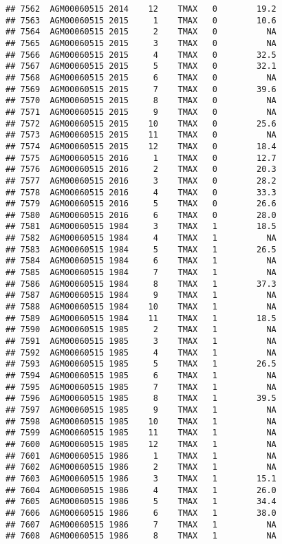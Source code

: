 \documentclass{article}\usepackage[]{graphicx}\usepackage[]{color}
\makeatletter
\newenvironment{kframe}{%
 \def\at@end@of@kframe{}%
 \ifinner\ifhmode%
  \def\at@end@of@kframe{\end{minipage}}%
  \begin{minipage}{\columnwidth}%
 \fi\fi%
 \def\FrameCommand##1{\hskip\@totalleftmargin \hskip-\fboxsep
 \colorbox{shadecolor}{##1}\hskip-\fboxsep
     \hskip-\linewidth \hskip-\@totalleftmargin \hskip\columnwidth}%
 \MakeFramed {\advance\hsize-\width
   \@totalleftmargin\z@ \linewidth\hsize
   \@setminipage}}%
 {\par\unskip\endMakeFramed%
 \at@end@of@kframe}
\newenvironment{knitrout}{}{} %
\makeatother
\begin{document}
\begin{knitrout}
\begin{kframe}
\begin{verbatim}
## 7562  AGM00060515 2014    12    TMAX   0        19.2
## 7563  AGM00060515 2015     1    TMAX   0        10.6
## 7564  AGM00060515 2015     2    TMAX   0          NA
## 7565  AGM00060515 2015     3    TMAX   0          NA
## 7566  AGM00060515 2015     4    TMAX   0        32.5
## 7567  AGM00060515 2015     5    TMAX   0        32.1
## 7568  AGM00060515 2015     6    TMAX   0          NA
## 7569  AGM00060515 2015     7    TMAX   0        39.6
## 7570  AGM00060515 2015     8    TMAX   0          NA
## 7571  AGM00060515 2015     9    TMAX   0          NA
## 7572  AGM00060515 2015    10    TMAX   0        25.6
## 7573  AGM00060515 2015    11    TMAX   0          NA
## 7574  AGM00060515 2015    12    TMAX   0        18.4
## 7575  AGM00060515 2016     1    TMAX   0        12.7
## 7576  AGM00060515 2016     2    TMAX   0        20.3
## 7577  AGM00060515 2016     3    TMAX   0        28.2
## 7578  AGM00060515 2016     4    TMAX   0        33.3
## 7579  AGM00060515 2016     5    TMAX   0        26.6
## 7580  AGM00060515 2016     6    TMAX   0        28.0
## 7581  AGM00060515 1984     3    TMAX   1        18.5
## 7582  AGM00060515 1984     4    TMAX   1          NA
## 7583  AGM00060515 1984     5    TMAX   1        26.5
## 7584  AGM00060515 1984     6    TMAX   1          NA
## 7585  AGM00060515 1984     7    TMAX   1          NA
## 7586  AGM00060515 1984     8    TMAX   1        37.3
## 7587  AGM00060515 1984     9    TMAX   1          NA
## 7588  AGM00060515 1984    10    TMAX   1          NA
## 7589  AGM00060515 1984    11    TMAX   1        18.5
## 7590  AGM00060515 1985     2    TMAX   1          NA
## 7591  AGM00060515 1985     3    TMAX   1          NA
## 7592  AGM00060515 1985     4    TMAX   1          NA
## 7593  AGM00060515 1985     5    TMAX   1        26.5
## 7594  AGM00060515 1985     6    TMAX   1          NA
## 7595  AGM00060515 1985     7    TMAX   1          NA
## 7596  AGM00060515 1985     8    TMAX   1        39.5
## 7597  AGM00060515 1985     9    TMAX   1          NA
## 7598  AGM00060515 1985    10    TMAX   1          NA
## 7599  AGM00060515 1985    11    TMAX   1          NA
## 7600  AGM00060515 1985    12    TMAX   1          NA
## 7601  AGM00060515 1986     1    TMAX   1          NA
## 7602  AGM00060515 1986     2    TMAX   1          NA
## 7603  AGM00060515 1986     3    TMAX   1        15.1
## 7604  AGM00060515 1986     4    TMAX   1        26.0
## 7605  AGM00060515 1986     5    TMAX   1        34.4
## 7606  AGM00060515 1986     6    TMAX   1        38.0
## 7607  AGM00060515 1986     7    TMAX   1          NA
## 7608  AGM00060515 1986     8    TMAX   1          NA

\end{verbatim}
\end{kframe}
\end{knitrout}
\end{document}
